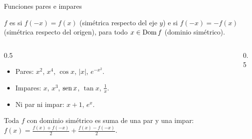 \documentclass[10pt,aspectratio=169]{beamer}
\begin{document}
\begin{frame}{Funciones pares e impares}
  \begin{definicion}
    $f$ es  si $f(-x)=f(x)$ (simétrica respecto del eje $y$) e  si $f(-x)=-f(x)$
    (simétrica respecto del origen), para todo $x\in\operatorname{Dom} f$ (dominio simétrico).
  \end{definicion}
  \begin{columns}
    \begin{column}{0.5\textwidth}
      \begin{ejemplo}
        \begin{itemize}
          \item Pares: $x^2$, $x^4$, $\cos x$, $|x|$, $e^{-x^2}$.
          \item Impares: $x$, $x^3$, $\operatorname{sen} x$, $\tan x$, $\frac1x$.
          \item Ni par ni impar: $x+1$, $e^x$.
        \end{itemize}
      \end{ejemplo}
      \small Toda $f$ con dominio simétrico es suma de una par y una impar:
      $f(x)=\frac{f(x)+f(-x)}2+\frac{f(x)-f(-x)}2$.
    \end{column}
    \begin{column}{0.5\textwidth}
      \centering
    \end{column}
  \end{columns}
\end{frame}
\end{document}
